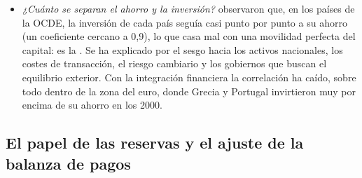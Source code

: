\documentclass[11pt]{article}
\begin{document}
\begin{itemize}
\item \emph{¿Cuánto se separan el ahorro y la inversión?} \textcite{FeldsteinHorioka1980} observaron que, en los países de la OCDE, la inversión de cada país seguía casi punto por punto a su ahorro (un coeficiente cercano a 0,9), lo que casa mal con una movilidad perfecta del capital: es la    . Se ha explicado por el sesgo hacia los activos nacionales, los costes de transacción, el riesgo cambiario y los gobiernos que buscan el equilibrio exterior. Con la integración financiera la correlación ha caído, sobre todo dentro de la zona del euro, donde Grecia y Portugal invirtieron muy por encima de su ahorro en los 2000\nocite{BlanchardGiavazzi2002}.
\end{itemize}

\begin{infografia}[H]
\centering
\caption{Diagnóstico de un déficit corriente que se amplía}\label{figu:diagnostico-deficit}
\end{infografia}

\subsection{El papel de las reservas y el ajuste de la balanza de pagos}\label{sec:reservas-ajuste}
\end{document}
